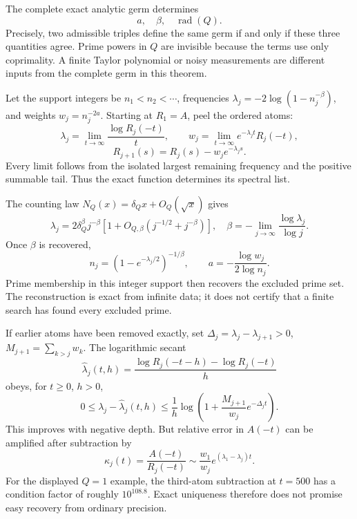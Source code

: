 The complete exact analytic germ determines
\[
\boxed{a,\quad\beta,\quad\operatorname{rad}(Q).}
\]
Precisely, two admissible triples define the same germ if and only if these
three quantities agree. Prime powers in $Q$ are invisible because the terms
use only coprimality. A finite Taylor polynomial or noisy measurements are
different inputs from the complete germ in this theorem.

Let the support integers be $n_1<n_2<\cdots$, frequencies
$\lambda_j=-2\log(1-n_j^{-\beta})$, and weights $w_j=n_j^{-2a}$.
Starting at $R_1=A$, peel the ordered atoms:
\[
\lambda_j=\lim_{t\to\infty}\frac{\log R_j(-t)}t,\qquad
w_j=\lim_{t\to\infty}e^{-\lambda_jt}R_j(-t),
\]
\[
R_{j+1}(s)=R_j(s)-w_je^{-\lambda_js}.
\]
Every limit follows from the isolated largest remaining frequency and the
positive summable tail. Thus the exact function determines its spectral list.

The counting law $N_Q(x)=\delta_Qx+O_Q(\sqrt x)$ gives
\[
\lambda_j=2\delta_Q^\beta j^{-\beta}
[1+O_{Q,\beta}(j^{-1/2}+j^{-\beta})],
\quad
\beta=-\lim_{j\to\infty}\frac{\log\lambda_j}{\log j}.
\]
Once $\beta$ is recovered,
\[
n_j=(1-e^{-\lambda_j/2})^{-1/\beta},\qquad
a=-\frac{\log w_j}{2\log n_j}.
\]
Prime membership in this integer support then recovers the excluded prime
set. The reconstruction is exact from infinite data; it does not certify
that a finite search has found every excluded prime.

If earlier atoms have been removed exactly, set
$\Delta_j=\lambda_j-\lambda_{j+1}>0$, $M_{j+1}=\sum_{k>j}w_k$.
The logarithmic secant
\[
\widehat\lambda_j(t,h)=\frac{\log R_j(-t-h)-\log R_j(-t)}h
\]
obeys, for $t\ge0$, $h>0$,
\[
0\le\lambda_j-\widehat\lambda_j(t,h)
\le\frac1h\log\left(1+\frac{M_{j+1}}{w_j}e^{-\Delta_jt}\right).
\]
This improves with negative depth. But relative error in $A(-t)$ can be
amplified after subtraction by
\[
\kappa_j(t)=\frac{A(-t)}{R_j(-t)}
\sim\frac{w_1}{w_j}e^{(\lambda_1-\lambda_j)t}.
\]
For the displayed $Q=1$ example, the third-atom subtraction at $t=500$
has a condition factor of roughly $10^{108.8}$. Exact uniqueness therefore
does not promise easy recovery from ordinary precision.

